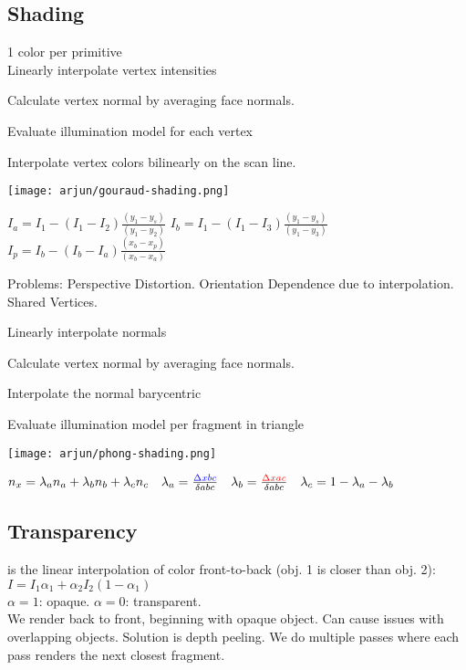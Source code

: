 \subsection*{Shading}
 1 color per primitive \\
 Linearly interpolate vertex intensities
\begin{compactenum}
    \item Calculate vertex normal by averaging face normals.
    \item Evaluate illumination model for each vertex
    \item Interpolate vertex colors bilinearly on the scan line.
\end{compactenum}
\begin{center}
    \texttt{[image: arjun/gouraud-shading.png]}
\end{center}

$I_a = I_1 - (I_1 - I_2)\frac{(y_1-y_s)}{(y_1 - y_2)}$  
$I_b = I_1 - \left(I_1 - I_3\right) \frac{\left(y_1 - y_s\right)}{\left(y_1 - y_3\right)}$ 
$I_p = I_b - \left(I_b - I_a\right) \frac{\left(x_b - x_p\right)}{\left(x_b - x_a\right)}
$

Problems: Perspective Distortion. Orientation Dependence due to interpolation. Shared Vertices.

 Linearly interpolate normals
\begin{compactenum}
    \item Calculate vertex normal by averaging face normals.
    \item Interpolate the normal barycentric
    \item Evaluate illumination model per fragment in triangle
\end{compactenum}
\begin{center}
    \texttt{[image: arjun/phong-shading.png]}
\end{center}

$ n_x = \lambda_an_a + \lambda_bn_b + \lambda_cn_c  \quad \lambda_a = \frac{\color{blue} \Delta xbc}{\delta abc} \quad \lambda_b = \frac{\color{red} \Delta xac}{\delta abc} \quad \lambda_c = 1 - \lambda_a - \lambda_b$ 

\subsection*{Transparency}
 is the linear interpolation of color front-to-back (obj. 1 is closer than obj. 2): $I = I_1 \alpha_1 + \alpha_2 I_2 (1 - \alpha_1)$\\
$\alpha = 1 $: opaque. $\alpha = 0$: transparent.\\
We render back to front, beginning with opaque object. Can cause issues with overlapping objects. Solution is depth peeling. We do multiple passes where each pass renders the next closest fragment.
